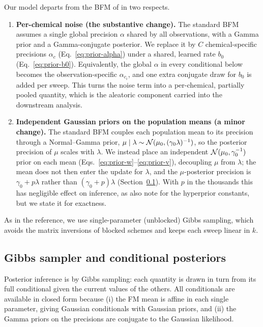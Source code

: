 Our model departs from the BFM of \citet{rendle2011bayesian} in two respects.
\begin{enumerate}
  \item \textbf{Per-chemical noise (the substantive change).} The standard BFM
  assumes a single global precision $\alpha$ shared by all observations, with a
  Gamma prior and a Gamma-conjugate posterior. We replace it by $C$
  chemical-specific precisions $\alpha_c$ (Eq.~\ref{eq:prior-alpha}) under a
  shared, learned rate $b_0$ (Eq.~\ref{eq:prior-b0}). Equivalently, the global
  $\alpha$ in every conditional below becomes the observation-specific
  $\alpha_{c_i}$, and one extra conjugate draw for $b_0$ is added per sweep. This
  turns the noise term into a per-chemical, partially pooled quantity, which is
  the aleatoric component carried into the downstream analysis.

  \item \textbf{Independent Gaussian priors on the population means (a minor
  change).} The standard BFM couples each population mean to its precision
  through a Normal--Gamma prior, $\mu \mid \lambda \sim
  \mathcal{N}(\mu_0,(\gamma_0\lambda)^{-1})$, so the posterior precision of $\mu$
  scales with $\lambda$. We instead place an independent
  $\mathcal{N}(\mu_0,\gamma_0^{-1})$ prior on each mean (Eqs.~\ref{eq:prior-w}--\ref{eq:prior-v}),
  decoupling $\mu$ from $\lambda$; the mean does not then enter the update for
  $\lambda$, and the $\mu$-posterior precision is $\gamma_0+p\lambda$ rather than
  $(\gamma_0+p)\lambda$ (Section~\ref{sec:sampler}). With $p$ in the thousands
  this has negligible effect on inference, as \citet{rendle2011bayesian} also
  note for the hyperprior constants, but we state it for exactness.
\end{enumerate}
As in the reference, we use single-parameter (unblocked) Gibbs sampling, which
avoids the matrix inversions of blocked schemes and keeps each sweep linear in
$k$.

\subsection{Gibbs sampler and conditional posteriors}
\label{sec:sampler}

Posterior inference is by Gibbs sampling: each quantity is drawn in turn from its
full conditional given the current values of the others. All conditionals are
available in closed form because (i) the FM mean is affine in each single
parameter, giving Gaussian conditionals with Gaussian priors, and (ii) the
Gamma priors on the precisions are conjugate to the Gaussian likelihood.

